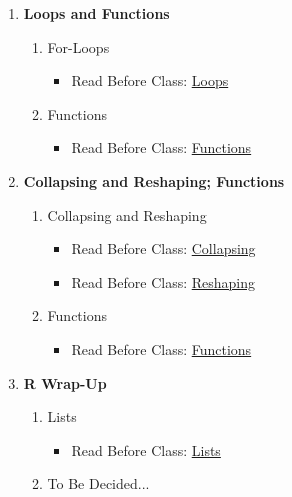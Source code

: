 \documentclass[12pt]{article}
\begin{document}
\begin{enumerate}[label=\textbf{Week \arabic*:}]
	\item \textbf{Loops and Functions}
	\begin{enumerate}[label=Class \arabic*:]
		\item For-Loops
		\begin{itemize}
			\item Read Before Class: \href{https://nickeubank.github.io/rfordatascience/html/loops.html}{Loops}
		\end{itemize}
		\item Functions
		\begin{itemize}
			\item Read Before Class: \href{https://nickeubank.github.io/rfordatascience/html/functions.html}{Functions}
		\end{itemize}
	\end{enumerate}

	\item \textbf{Collapsing and Reshaping; Functions}
	\begin{enumerate}[label=Class \arabic*:]
		\item Collapsing and Reshaping
		\begin{itemize}
			\item Read Before Class: \href{https://nickeubank.github.io/rfordatascience/html/collapsing.html}{Collapsing}
			\item Read Before Class: \href{https://nickeubank.github.io/rfordatascience/html/reshaping.html}{Reshaping}
		\end{itemize}
		\item Functions
		\begin{itemize}
			\item Read Before Class: \href{https://nickeubank.github.io/rfordatascience/html/functions.html}{Functions}
		\end{itemize}
	\end{enumerate}

	\item \textbf{R Wrap-Up}
	\begin{enumerate}[label=Class \arabic*:]
		\item Lists
		\begin{itemize}
			\item Read Before Class: \href{https://nickeubank.github.io/rfordatascience/html/lists.html}{Lists}
		\end{itemize}
		\item To Be Decided...
	\end{enumerate}
\end{enumerate}
\end{document}
